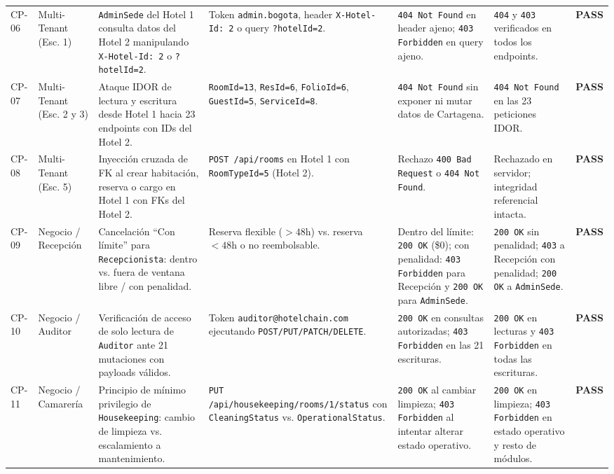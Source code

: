 \documentclass[12pt,a4paper]{article}
\begin{document}
\begin{longtable}{p{1.3cm} p{2.1cm} p{3.1cm} p{2.6cm} p{2.0cm} p{2.0cm} p{1.3cm}}
CP-06 & Multi-Tenant (Esc. 1) & \texttt{AdminSede} del Hotel 1 consulta datos del Hotel 2 manipulando \texttt{X-Hotel-Id: 2} o \texttt{?hotelId=2}. & Token \texttt{admin.bogota}, header \texttt{X-Hotel-Id: 2} o query \texttt{?hotelId=2}. & \texttt{404 Not Found} en header ajeno; \texttt{403 Forbidden} en query ajeno. & \texttt{404} y \texttt{403} verificados en todos los endpoints. & \textcolor{verdepass}{\textbf{PASS}}\\[0.12cm]
CP-07 & Multi-Tenant (Esc. 2 y 3) & Ataque IDOR de lectura y escritura desde Hotel 1 hacia 23 endpoints con IDs del Hotel 2. & \texttt{RoomId=13}, \texttt{ResId=6}, \texttt{FolioId=6}, \texttt{GuestId=5}, \texttt{ServiceId=8}. & \texttt{404 Not Found} sin exponer ni mutar datos de Cartagena. & \texttt{404 Not Found} en las 23 peticiones IDOR. & \textcolor{verdepass}{\textbf{PASS}}\\[0.12cm]
CP-08 & Multi-Tenant (Esc. 5) & Inyecci\'on cruzada de FK al crear habitaci\'on, reserva o cargo en Hotel 1 con FKs del Hotel 2. & \texttt{POST /api/rooms} en Hotel 1 con \texttt{RoomTypeId=5} (Hotel 2). & Rechazo \texttt{400 Bad Request} o \texttt{404 Not Found}. & Rechazado en servidor; integridad referencial intacta. & \textcolor{verdepass}{\textbf{PASS}}\\[0.12cm]
CP-09 & Negocio / Recepci\'on & Cancelaci\'on ``Con l\'imite'' para \texttt{Recepcionista}: dentro vs. fuera de ventana libre / con penalidad. & Reserva flexible ($>48\text{h}$) vs. reserva $<48\text{h}$ o no reembolsable. & Dentro del l\'imite: \texttt{200 OK} (\$0); con penalidad: \texttt{403 Forbidden} para Recepci\'on y \texttt{200 OK} para \texttt{AdminSede}. & \texttt{200 OK} sin penalidad; \texttt{403} a Recepci\'on con penalidad; \texttt{200 OK} a \texttt{AdminSede}. & \textcolor{verdepass}{\textbf{PASS}}\\[0.12cm]
CP-10 & Negocio / Auditor & Verificaci\'on de acceso de solo lectura de \texttt{Auditor} ante 21 mutaciones con payloads v\'alidos. & Token \texttt{auditor@hotelchain.com} ejecutando \texttt{POST/PUT/PATCH/DELETE}. & \texttt{200 OK} en consultas autorizadas; \texttt{403 Forbidden} en las 21 escrituras. & \texttt{200 OK} en lecturas y \texttt{403 Forbidden} en todas las escrituras. & \textcolor{verdepass}{\textbf{PASS}}\\[0.12cm]
CP-11 & Negocio / Camarer\'ia & Principio de m\'inimo privilegio de \texttt{Housekeeping}: cambio de limpieza vs. escalamiento a mantenimiento. & \texttt{PUT /api/housekeeping/rooms/1/status} con \texttt{CleaningStatus} vs. \texttt{OperationalStatus}. & \texttt{200 OK} al cambiar limpieza; \texttt{403 Forbidden} al intentar alterar estado operativo. & \texttt{200 OK} en limpieza; \texttt{403 Forbidden} en estado operativo y resto de m\'odulos. & \textcolor{verdepass}{\textbf{PASS}}\\[0.12cm]

\end{longtable}
\end{document}
